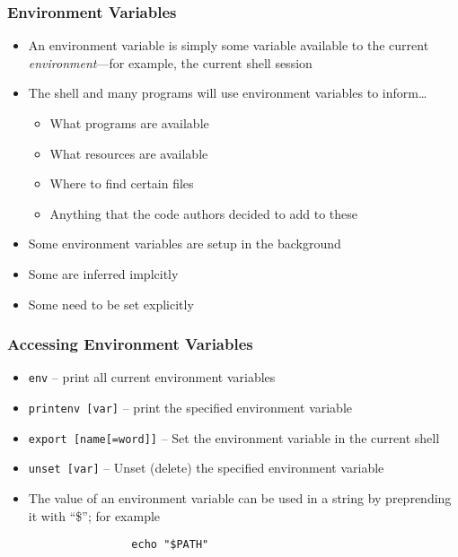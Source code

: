 \documentclass[aspectratio=169]{beamer}
\begin{document}
\frame{\sectionpage}

\begin{frame}
	\frametitle{Environment Variables}
	\begin{itemize}
		\item An environment variable is simply some variable available to the current \emph{environment}---for example, the current shell session
		\item The shell and many programs will use environment variables to inform\dots
			\begin{itemize}
				\item What programs are available
				\item What resources are available
				\item Where to find certain files
				\item Anything that the code authors decided to add to these
			\end{itemize}
		\item Some environment variables are setup in the background
		\item Some are inferred implcitly
		\item Some need to be set explicitly
	\end{itemize}
\end{frame}

\begin{frame}[fragile]
	\frametitle{Accessing Environment Variables}
	\begin{itemize}
		\item \texttt{env} -- print all current environment variables
		\item \texttt{printenv [var]} -- print the specified environment variable
		\item \texttt{export [name[=word]]} -- Set the environment variable in the current shell
		\item \texttt{unset [var]} -- Unset (delete) the specified environment variable
		\item The value of an environment variable can be used in a string by preprending it with ``\$''; for example
			\begin{verbatim}
				echo "$PATH"
			\end{verbatim}
	\end{itemize}
\end{frame}
\end{document}
